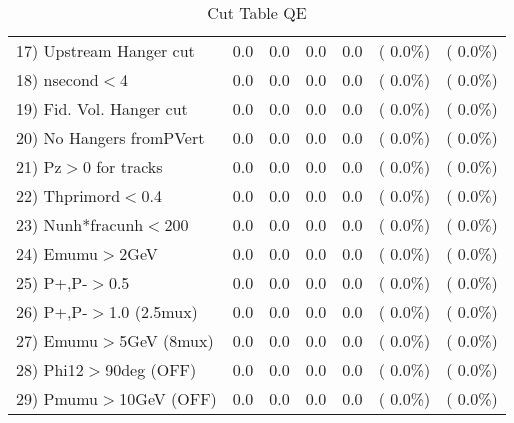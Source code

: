 \begin{table}[h!]
\begin{tabular}{||l||r|r|r|r|r|r||}
 17) Upstream Hanger cut  &          0.0 &          0.0 &          0.0 &          0.0 & (  0.0\%) & (  0.0\%) \\
 18) nsecond$<$4          &          0.0 &          0.0 &          0.0 &          0.0 & (  0.0\%) & (  0.0\%) \\
 19) Fid. Vol. Hanger cut &          0.0 &          0.0 &          0.0 &          0.0 & (  0.0\%) & (  0.0\%) \\
 20) No Hangers fromPVert &          0.0 &          0.0 &          0.0 &          0.0 & (  0.0\%) & (  0.0\%) \\
 21) Pz$>$0 for tracks    &          0.0 &          0.0 &          0.0 &          0.0 & (  0.0\%) & (  0.0\%) \\
 22) Thprimord$<$0.4      &          0.0 &          0.0 &          0.0 &          0.0 & (  0.0\%) & (  0.0\%) \\
 23) Nunh*fracunh$<$200   &          0.0 &          0.0 &          0.0 &          0.0 & (  0.0\%) & (  0.0\%) \\
 24) Emumu$>$2GeV         &          0.0 &          0.0 &          0.0 &          0.0 & (  0.0\%) & (  0.0\%) \\
 25) P+,P-$>$0.5          &          0.0 &          0.0 &          0.0 &          0.0 & (  0.0\%) & (  0.0\%) \\
 26) P+,P-$>$1.0 (2.5mux) &          0.0 &          0.0 &          0.0 &          0.0 & (  0.0\%) & (  0.0\%) \\
 27) Emumu$>$5GeV  (8mux) &          0.0 &          0.0 &          0.0 &          0.0 & (  0.0\%) & (  0.0\%) \\
 28) Phi12$>$90deg  (OFF) &          0.0 &          0.0 &          0.0 &          0.0 & (  0.0\%) & (  0.0\%) \\
 29) Pmumu$>$10GeV  (OFF) &          0.0 &          0.0 &          0.0 &          0.0 & (  0.0\%) & (  0.0\%) \\
 \hline
 \hline
 \end{tabular}
 \caption{Cut Table  QE       }
 \label{tab-cutcohjpsi-mumu_qe}
 \end{table}
